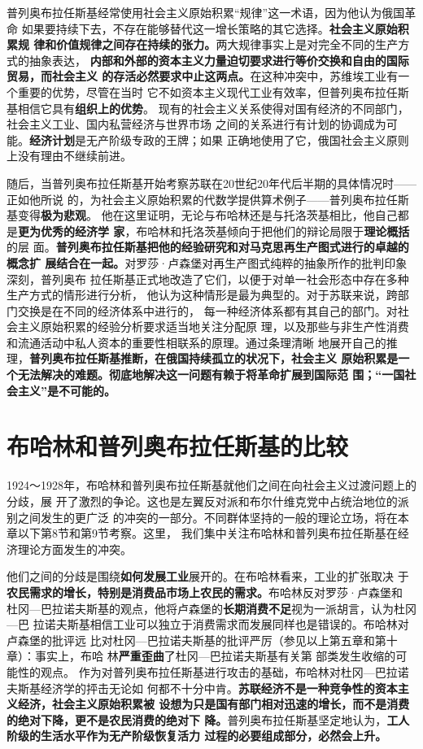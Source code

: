普列奥布拉任斯基经常使用社会主义原始积累“规律”这一术语，因为他认为俄国革命
如果要持续下去，不存在能够替代这一增长策略的其它选择。\textbf{社会主义原始积累规
律和价值规律之间存在持续的张力。}两大规律事实上是对完全不同的生产方式的抽象表达，
\textbf{内部和外部的资本主义力量迫切要求进行等价交换和自由的国际贸易，而社会主义
的存活必然要求中止这两点。}在这种冲突中，苏维埃工业有一个重要的优势，尽管在当时
它不如资本主义现代工业有效率，但普列奥布拉任斯基相信它具有\textbf{组织上的优势}。
现有的社会主义关系使得对国有经济的不同部门，社会主义工业、国内私营经济与世界市场
之间的关系进行有计划的协调成为可能。\textbf{经济计划}是无产阶级专政的王牌；如果
正确地使用了它，俄国社会主义原则上没有理由不继续前进。


随后，当普列奥布拉任斯基开始考察苏联在20世纪20年代后半期的具体情况时——正如他所说
的，为社会主义原始积累的代数学提供算术例子——普列奥布拉任斯基变得\textbf{极为悲观}。
他在这里证明，无论与布哈林还是与托洛茨基相比，他自己都是\textbf{更为优秀的经济学
  家}，布哈林和托洛茨基倾向于把他们的辩论局限于\textbf{理论概括}的层
面。\textbf{普列奥布拉任斯基把他的经验研究和对马克思再生产图式进行的卓越的概念扩
  展结合在一起。}对罗莎·卢森堡对再生产图式纯粹的抽象所作的批判印象深刻，普列奥布
拉任斯基正式地改造了它们，以便于对单一社会形态中存在多种生产方式的情形进行分析，
他认为这种情形是最为典型的。对于苏联来说，跨部门交换是在不同的经济体系中进行的，
每一种经济体系都有其自己的部门。对社会主义原始积累的经验分析要求适当地关注分配原
理，以及那些与非生产性消费和流通活动中私人资本的重要性相联系的原理。通过条理清晰
地展开自己的推理，\textbf{普列奥布拉任斯基推断，在俄国持续孤立的状况下，社会主义
  原始积累是一个无法解决的难题。彻底地解决这一问题有赖于将革命扩展到国际范
  围；“一国社会主义”是不可能的。}

\section{布哈林和普列奥布拉任斯基的比较}

1924～1928年，布哈林和普列奥布拉任斯基就他们之间在向社会主义过渡问题上的分歧，展
开了激烈的争论。这也是左翼反对派和布尔什维克党中占统治地位的派别之间发生的更广泛
的冲突的一部分。不同群体坚持的一般的理论立场，将在本章以下第8节和第9节考察。这里，
我们集中关注布哈林和普列奥布拉任斯基在经济理论方面发生的冲突。

他们之间的分歧是围绕\textbf{如何发展工业}展开的。在布哈林看来，工业的扩张取决
于\textbf{农民需求的增长，特别是消费品市场上农民的需求。}布哈林反对罗莎·卢森堡和
杜冈—巴拉诺夫斯基的观点，他将卢森堡的\textbf{长期消费不足}视为一派胡言，认为杜冈—巴
拉诺夫斯基相信工业可以独立于消费需求而发展同样也是错误的。布哈林对卢森堡的批评远
比对杜冈—巴拉诺夫斯基的批评严厉（参见以上第五章和第十章）：事实上，布哈
林\textbf{严重歪曲}了杜冈—巴拉诺夫斯基有关第 部类发生收缩的可能性的观点。
作为对普列奥布拉任斯基进行攻击的基础，布哈林对杜冈—巴拉诺夫斯基经济学的抨击无论如
何都不十分中肯。\textbf{苏联经济不是一种竞争性的资本主义经济，社会主义原始积累被
  设想为只是国有部门相对迅速的增长，而不是消费的绝对下降，更不是农民消费的绝对下
  降。}普列奥布拉任斯基坚定地认为，\textbf{工人阶级的生活水平作为无产阶级恢复活力
  过程的必要组成部分，必然会上升。}

